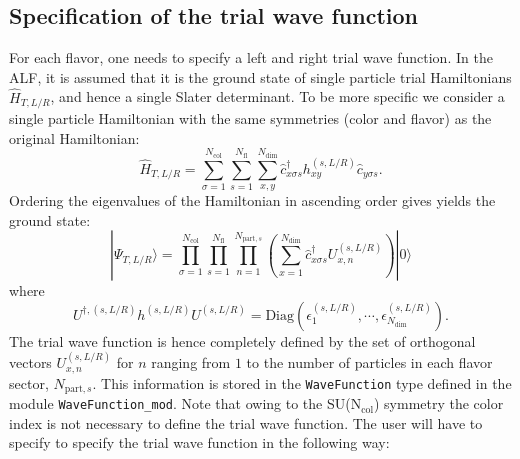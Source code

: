 \subsection{ Specification of the trial wave function }

For each flavor, one needs to specify a left and right trial wave function. In the ALF, it is assumed that it is the ground state of  single particle trial  Hamiltonians $\hat{H}_{T, L/R}$, and hence a single Slater determinant.   To be more specific we consider a  single particle Hamiltonian with the  same symmetries   (color and flavor) as the original Hamiltonian: 
\begin{equation}
\hat{H}_{T,L/R} = 
\sum\limits_{\sigma=1}^{N_{\mathrm{col}}}
\sum\limits_{s=1}^{N_{\mathrm{fl}}}
\sum\limits_{x,y}^{N_{\mathrm{dim}}}
\hat{c}^{\dagger}_{x \sigma   s} h_{xy}^{(s, L/R)} \hat{c}^{\phantom\dagger}_{y \sigma s}.
\end{equation}
Ordering the eigenvalues  of the Hamiltonian in ascending order gives  yields the ground state: 
\begin{equation}
	 | \Psi_{T,L/R} \rangle    =     \prod_{\sigma=1}^{N_{\mathrm{col}}}  \prod_{s=1}^{N_{\mathrm{fl}}}      \prod_{n=1}^{N_{\mathrm{part},s}} 
	 \left( \sum_{x=1}^{N_{\mathrm{dim}}}    \hat{c}^{\dagger}_{x \sigma   s} U^{(s, L/R)}_{x,n} \right) 
	  | 0 \rangle 
\end{equation} 
where 
\begin{equation}
	U^{\dagger,(s, L/R)}h^{(s, L/R)}  U^{(s, L/R)}   = \mathrm{Diag} \left(   \epsilon_1^{(s, L/R)}, \cdots, \epsilon_{N_{\mathrm{dim}}}^{(s, L/R)} \right).
\end{equation}
The trial wave function is hence  completely defined by the set of orthogonal vectors  $ U^{(s, L/R)}_{x,n}  $    for  $ n $ ranging from  $ 1 $ to  the number of particles   in each flavor sector,  $N_{\mathrm{part},s}$.    This information  is stored in the \texttt{WaveFunction}   type defined in the module \texttt{WaveFunction\_mod}.    Note  that  owing to the SU(N$_{\mathrm{col}}$) symmetry the color index is not necessary to define  the trial wave function.  The user will have to specify to specify  the trial wave function in the following way:


